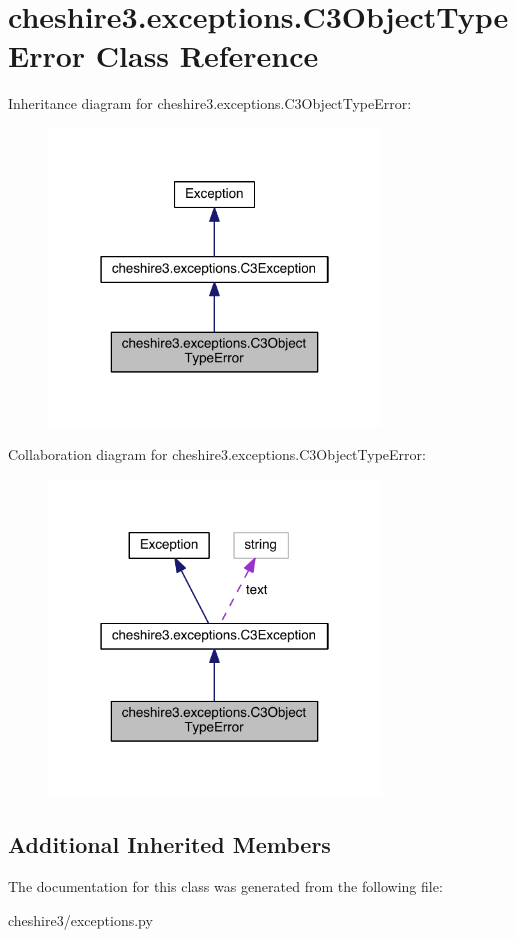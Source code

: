 \hypertarget{classcheshire3_1_1exceptions_1_1_c3_object_type_error}{\section{cheshire3.\-exceptions.\-C3\-Object\-Type\-Error Class Reference}
\label{classcheshire3_1_1exceptions_1_1_c3_object_type_error}
}


Inheritance diagram for cheshire3.\-exceptions.\-C3\-Object\-Type\-Error\-:
\nopagebreak
\begin{figure}[H]
\begin{center}
\leavevmode
\includegraphics[width=250pt]{classcheshire3_1_1exceptions_1_1_c3_object_type_error__inherit__graph}
\end{center}
\end{figure}


Collaboration diagram for cheshire3.\-exceptions.\-C3\-Object\-Type\-Error\-:
\nopagebreak
\begin{figure}[H]
\begin{center}
\leavevmode
\includegraphics[width=250pt]{classcheshire3_1_1exceptions_1_1_c3_object_type_error__coll__graph}
\end{center}
\end{figure}
\subsection*{Additional Inherited Members}


The documentation for this class was generated from the following file\-:\begin{DoxyCompactItemize}
\item 
cheshire3/exceptions.\-py\end{DoxyCompactItemize}
